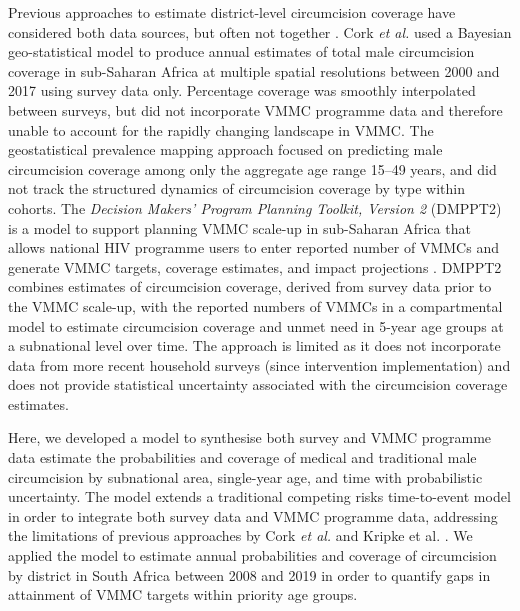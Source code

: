 \documentclass{article}
\begin{document}
Previous approaches to estimate district-level circumcision coverage have considered both data sources, but often not together \cite{cork2020mapping, kripke2016age, kripke2016cost}. Cork \textit{et al.} used a Bayesian geo-statistical model to produce annual estimates of total male circumcision coverage in sub-Saharan Africa at multiple spatial resolutions between 2000 and 2017 \cite{cork2020mapping} using survey data only. Percentage coverage was smoothly interpolated between surveys, but did not incorporate VMMC programme data and therefore unable to account for the rapidly changing landscape in VMMC. The geostatistical prevalence mapping approach focused on predicting male circumcision coverage among only the aggregate age range 15--49 years, and did not track the structured dynamics of circumcision coverage by type within cohorts. The \textit{Decision Makers' Program Planning Toolkit, Version 2} (DMPPT2) is a model to support planning VMMC scale-up in sub-Saharan Africa that allows national HIV programme users to enter reported number of VMMCs and generate VMMC targets, coverage estimates, and impact projections \cite{kripke2016age, kripke2016cost}. DMPPT2 combines estimates of circumcision coverage, derived from survey data prior to the VMMC scale-up, with the reported numbers of VMMCs in a compartmental model to estimate circumcision coverage and unmet need in 5-year age groups at a subnational level over time. The approach is limited as it does not incorporate data from more recent household surveys (since intervention implementation) and does not provide statistical uncertainty associated with the circumcision coverage estimates.

Here, we developed a model to synthesise both survey and VMMC programme data estimate the probabilities and coverage of medical and traditional male circumcision by subnational area, single-year age, and time with probabilistic uncertainty. The model extends a traditional competing risks time-to-event model in order to integrate both survey data and VMMC programme data, addressing the limitations of previous approaches by Cork \textit{et al.} \cite{cork2020mapping} and Kripke et al. \cite{kripke2016age}. We applied the model to estimate annual probabilities and coverage of circumcision by district in South Africa between 2008 and 2019 in order to quantify gaps in attainment of VMMC targets within priority age groups.

\end{document}
